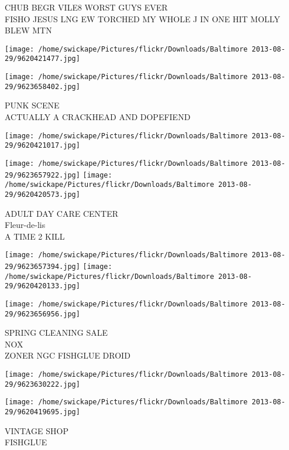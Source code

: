 \documentclass[10pt,letterpaper]{article}
\begin{document}
CHUB BEGR VILE8 WORST GUYS EVER\\
FISHO JESUS LNG EW TORCHED MY WHOLE J IN ONE HIT MOLLY BLEW MTN\\
\pagebreak

\texttt{[image: /home/swickape/Pictures/flickr/Downloads/Baltimore 2013-08-29/9620421477.jpg]}

\vspace{0.25in}
\texttt{[image: /home/swickape/Pictures/flickr/Downloads/Baltimore 2013-08-29/9623658402.jpg]}

PUNK SCENE\\
ACTUALLY A CRACKHEAD AND DOPEFIEND\\
\pagebreak

\texttt{[image: /home/swickape/Pictures/flickr/Downloads/Baltimore 2013-08-29/9620421017.jpg]}

\vspace{0.25in}
\texttt{[image: /home/swickape/Pictures/flickr/Downloads/Baltimore 2013-08-29/9623657922.jpg]}
\texttt{[image: /home/swickape/Pictures/flickr/Downloads/Baltimore 2013-08-29/9620420573.jpg]}

ADULT DAY CARE CENTER\\
Fleur{-}de{-}lis\\
A TIME 2 KILL\\
\pagebreak

\texttt{[image: /home/swickape/Pictures/flickr/Downloads/Baltimore 2013-08-29/9623657394.jpg]}
\texttt{[image: /home/swickape/Pictures/flickr/Downloads/Baltimore 2013-08-29/9620420133.jpg]}

\vspace{0.25in}
\texttt{[image: /home/swickape/Pictures/flickr/Downloads/Baltimore 2013-08-29/9623656956.jpg]}

SPRING CLEANING SALE\\
NOX\\
ZONER NGC FISHGLUE DROID\\
\pagebreak

\texttt{[image: /home/swickape/Pictures/flickr/Downloads/Baltimore 2013-08-29/9623630222.jpg]}

\vspace{0.25in}
\texttt{[image: /home/swickape/Pictures/flickr/Downloads/Baltimore 2013-08-29/9620419695.jpg]}

VINTAGE SHOP\\
FISHGLUE\\
\pagebreak
\end{document}
